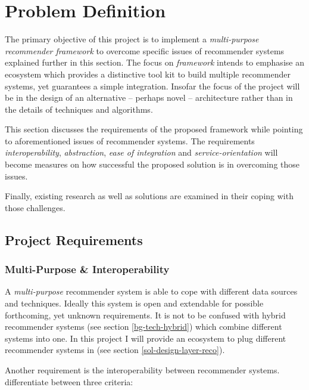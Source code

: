 \chapter{Problem Definition}
\label{problem}

The primary objective of this project is to implement a \textit{multi-purpose recommender framework} to overcome specific issues of recommender systems explained further in this section. The focus on \emph{framework} intends to emphasise an ecosystem which provides a distinctive tool kit to build multiple recommender systems, yet guarantees a simple integration. Insofar the focus of the project will be in the design of an alternative -- perhaps novel -- architecture rather than in the details of techniques and algorithms.

This section discusses the requirements of the proposed framework while pointing to aforementioned issues of recommender systems. The requirements \emph{interoperability}, \emph{abstraction}, \emph{ease of integration} and \emph{service-orientation} will become measures on how successful the proposed solution is in overcoming those issues.

Finally, existing research as well as solutions are examined in their coping with those challenges.



\section{Project Requirements}

\subsection{Multi-Purpose \& Interoperability}
\label{problem-multipurpose}

A \emph{multi-purpose} recommender system is able to cope with different data sources and techniques. Ideally this system is open and extendable for possible forthcoming, yet unknown requirements. It is not to be confused with hybrid recommender systems (see section \ref{bg-tech-hybrid}) which combine different systems into one. In this project I will provide an ecosystem to plug different recommender systems in (see section \ref{sol-design-layer-reco}).

Another requirement is the interoperability between recommender systems. \citet{manouselis07} differentiate between three criteria:

